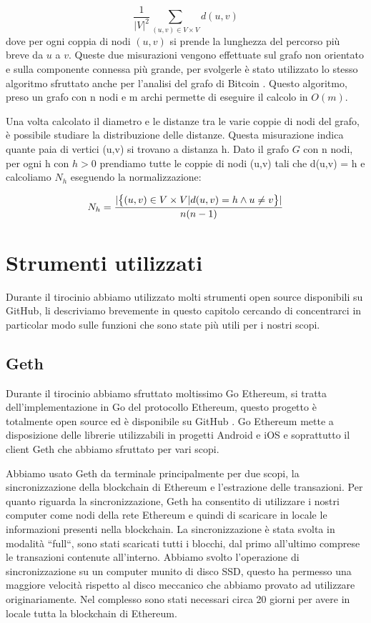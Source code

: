 \documentclass[12pt]{report}
\begin{document}
\begin{equation}
\frac{1} {|V|^{2}} \sum_{(u,v) \in V \times V} d(u, v) 
\end{equation}
dove per ogni coppia di nodi $(u,v)$ si prende la lunghezza del percorso più breve da $u$ a $v$.
Queste due misurazioni vengono effettuate sul grafo non orientato e sulla componente connessa più grande, per svolgerle è stato utilizzato lo stesso algoritmo sfruttato anche per l'analisi del grafo di Bitcoin \cite{maesa2016uncovering} \cite{maesa2016analysis} \cite{maesa2017data} \cite{maesa2017detecting}.
Questo algoritmo, preso un grafo con n nodi e m archi permette di eseguire il calcolo in $O(m)$.

Una volta calcolato il diametro e le distanze tra le varie coppie di nodi del grafo, è possibile studiare la distribuzione delle distanze.
Questa misurazione indica quante paia di vertici (u,v) si trovano a distanza h.
Dato il grafo $G$ con n nodi, per ogni h con $h > 0$ prendiamo tutte le coppie di nodi (u,v) tali che d(u,v) = h e calcoliamo $N_h$ eseguendo la normalizzazione:

\begin{equation}
N_h = \frac{|\big\{(u,v) \in V\times V \space | \space d(u,v) = h \land u \neq v\big\}|} {n(n-1)}
\end{equation}


\chapter{Strumenti utilizzati}

Durante il tirocinio abbiamo utilizzato molti strumenti open source disponibili su GitHub, li descriviamo brevemente in questo capitolo cercando di concentrarci in particolar modo sulle funzioni che sono state più utili per i nostri scopi.

\section{Geth}

Durante il tirocinio abbiamo sfruttato moltissimo Go Ethereum, si tratta dell'implementazione in Go \cite{GoLang} del protocollo Ethereum, questo progetto è totalmente open source ed è disponibile su GitHub \cite{goEthereum}.
Go Ethereum mette a disposizione delle librerie utilizzabili in progetti Android e iOS e soprattutto il client Geth che abbiamo sfruttato per vari scopi.

Abbiamo usato Geth da terminale principalmente per due scopi, la sincronizzazione della blockchain di Ethereum e l'estrazione delle transazioni.
Per quanto riguarda la sincronizzazione, Geth ha consentito di utilizzare i nostri computer come nodi della rete Ethereum e quindi di scaricare in locale le informazioni presenti nella blockchain.
La sincronizzazione è stata svolta in modalità ``full``, sono stati scaricati tutti i blocchi, dal primo all'ultimo comprese le transazioni contenute all'interno.
Abbiamo svolto l'operazione di sincronizzazione su un computer munito di disco SSD, questo ha permesso una maggiore velocità rispetto al disco meccanico che abbiamo provato ad utilizzare originariamente. Nel complesso sono stati necessari circa 20 giorni per avere in locale tutta la blockchain di Ethereum.
\end{document}

